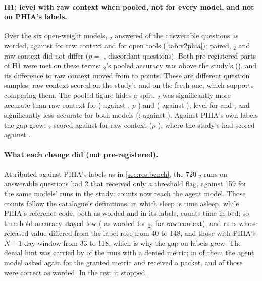 \paragraph{H1: level with raw context when pooled, not for every model, and not on PHIA's labels.} Over the six
open-weight models, \CC{}$_2$ answered \vtwoWordedPooledC{} \vtwoWordedPooledCIC{} of the answerable questions as
worded, against \vtwoWordedPooledA{} \vtwoWordedPooledCIA{} for raw context and \vtwoWordedPooledB{}
\vtwoWordedPooledCIB{} for open tools (\cref{tab:v2phia}); paired, \CC{}$_2$ and raw context did not differ
($p=$ \vtwoPooledMcn{}, \vtwoPooledMcnPairs{} discordant questions). Both pre-registered parts of H1 were met on these
terms: \CC{}$_2$'s pooled accuracy was above the study's \CC{} (\vtwoStudyWordedC{}), and its difference to raw
context moved from \vtwoGapStudy{} to \vtwoGapNew{} points. These are different question samples; raw context scored
\vtwoStudyWordedA{} on the study's and \vtwoWordedPooledA{} on the fresh one, which supports comparing them. The
pooled figure hides a split. \CC{}$_2$ was significantly more accurate than raw context for 
(\vtwoWordedLlamaThreeA{} against \vtwoWordedLlamaThreeC{}, $p$ \vtwoMcnLlamaThree{}) and 
(\vtwoWordedLlamaScoutA{} against \vtwoWordedLlamaScoutC{}), level for  and
, and significantly less accurate for both  models (:
\vtwoWordedOssLargeA{} against \vtwoWordedOssLargeC{}). Against PHIA's own labels the gap grew: \CC{}$_2$ scored
\vtwoLabelPooledC{} against \vtwoLabelPooledA{} for raw context ($p$ \vtwoLabelPooledMcn{}), where the study's \CC{} had
scored \vtwoStudyLabelC{} against \vtwoStudyLabelA{}.

\paragraph{What each change did (not pre-registered).} Attributed against PHIA's labels as in \cref{sec:res:bench},
the 720 \CC{}$_2$ runs on answerable questions had 2 that received only a threshold flag, against 159 for the same
models' \CC{} runs in the study: counts now reach the agent model. Those counts follow the catalogue's definitions,
in which sleep is time asleep, while PHIA's reference code, both as worded and in its labels, counts time in bed; so
threshold accuracy stayed low (\vtwoThrAcc{} as worded for \CC{}$_2$, \vtwoThrAccA{} for raw context), and runs whose
released value differed from the label rose from 40 to 148, and those with PHIA's $N{+}1$-day window from 33 to 118,
which is why the gap on labels grew. The denial hint was carried by \vtwoDeniedWithAlt{} of the \vtwoDeniedRuns{}
runs with a denied metric; in \vtwoDeniedFollowed{} of them the agent model asked again for the granted metric and
received a packet, and \vtwoDeniedFollowedCorrect{} of those were correct as worded. In the rest it stopped.

